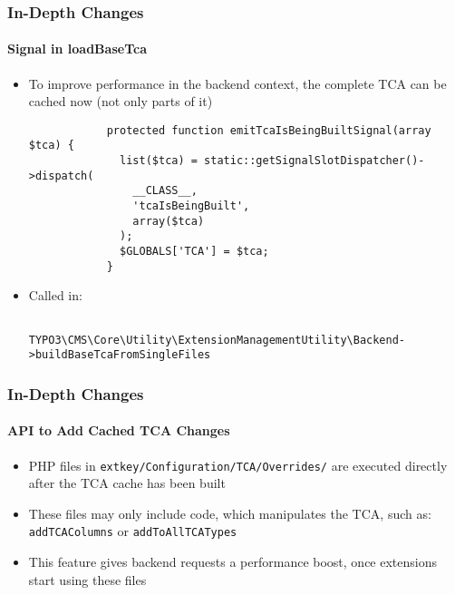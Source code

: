 \begin{frame}[fragile]
	\frametitle{In-Depth Changes}
	\framesubtitle{Signal in loadBaseTca}

	\lstset{
		basicstyle=\tiny\ttfamily
	}

	\begin{itemize}
		\item To improve performance in the backend context,
			the complete TCA can be cached now (not only parts of it)

		\begin{lstlisting}
			protected function emitTcaIsBeingBuiltSignal(array $tca) {
			  list($tca) = static::getSignalSlotDispatcher()->dispatch(
			    __CLASS__,
			    'tcaIsBeingBuilt',
			    array($tca)
			  );
			  $GLOBALS['TCA'] = $tca;
			}
		\end{lstlisting}

		\item Called in:

			\begin{lstlisting}
				TYPO3\CMS\Core\Utility\ExtensionManagementUtility\Backend->buildBaseTcaFromSingleFiles
			\end{lstlisting}

	\end{itemize}

\end{frame}


\begin{frame}[fragile]
	\frametitle{In-Depth Changes}
	\framesubtitle{API to Add Cached TCA Changes}

	\begin{itemize}
		\item PHP files in \texttt{extkey/Configuration/TCA/Overrides/}
			are executed directly after the TCA cache has been built

		\item These files may only include code, which manipulates the TCA,\newline
			such as: \texttt{addTCAColumns} or \texttt{addToAllTCATypes}

		\item This feature gives backend requests a performance boost, once extensions start using these files

	\end{itemize}

\end{frame}


